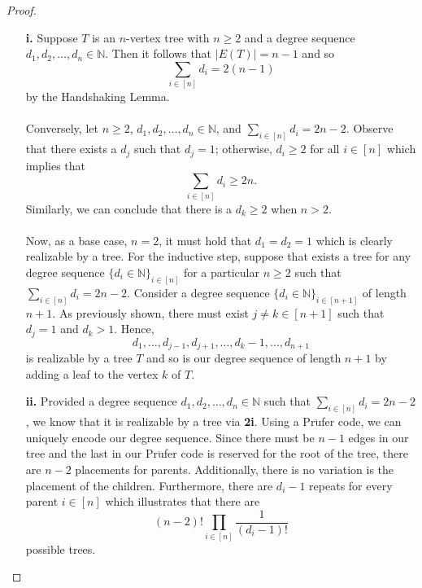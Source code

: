 \documentclass[ 12pt ]{article}
\begin{document}
\begin{enumerate}
		\begin{proof}
			\begin{enumerate}
				\item[\textbf{i.}] Suppose $T$ is an $n$-vertex tree with $n \geq 2$ and a degree sequence $d_1, d_2, \hdots, d_n \in \mathbb{N}$. Then it follows that $|E(T)| = n - 1$
					and so $$\sum_{i \in [n]} d_i = 2(n - 1)$$ by the Handshaking Lemma. \\ \\
					Conversely, let $n \geq 2$, $d_1, d_2, \hdots, d_n \in \mathbb{N}$, and $\sum_{i \in [n]} d_i = 2n - 2$. Observe that there exists a $d_j$ such that $d_j = 1$;
					otherwise, $d_i \geq 2$ for all $i \in [n]$ which implies that $$\sum_{i \in [n]} d_i \geq 2n.$$ Similarly, we can conclude that there is a $d_k \geq 2$ when $n >2$.
					\\ \\
					Now, as a base case, $n = 2$, it must hold that $d_1 = d_2 = 1$ which is clearly realizable by a tree. For the inductive step, suppose that exists a tree for any 
					degree sequence $\{ d_i \in \mathbb{N} \}_{i \in [n]}$ for a particular $n \geq 2$ such that $\sum_{i \in [n]} d_i = 2n - 2$. Consider a degree sequence $\{ d_i \in 
					\mathbb{N} \}_{i \in [n+1]}$ of length $n + 1$. As previously shown, there must exist $j \neq k \in [n + 1]$ such that $d_j = 1$ and $d_k > 1$. Hence, $$d_1, \hdots,
					d_{j-1}, d_{j+1}, \hdots, d_k - 1, \hdots, d_{n+1}$$ is realizable by a tree $T$ and so is our degree sequence of length $n+1$ by adding a leaf to the vertex $k$ of
					$T$.

				\item[\textbf{ii.}] Provided a degree sequence $d_1, d_2, \hdots, d_n \in \mathbb{N}$ such that $\sum_{i \in [n]} d_i = 2n - 2$, we know that it is realizable by a tree
					via \textbf{2i}. Using a Pr$\ddot{\mathrm{u}}$fer code, we can uniquely encode our degree sequence. Since there must be $n - 1$ edges in our tree and the last in our
					Pr$\ddot{\mathrm{u}}$fer code is reserved for the root of the tree, there are $n - 2$ placements for parents. Additionally, there is no variation is the placement of
					the children. Furthermore, there are $d_i - 1$ repeats for every parent $i \in [n]$ which illustrates that there are $$(n-2)!\prod_{i \in [n]}\frac{1}{ (d_i - 1)!}$$
					possible trees.


\end{enumerate}
\end{proof}
\end{enumerate}
\end{document}
